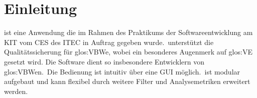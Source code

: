 \chapter{Einleitung}
\begin{normalsize}

\projektTitel ist eine Anwendung die im Rahmen des Praktikums der Softwareentwicklung am \gls{KIT} vom \gls{CES} des \gls{ITEC} in Auftrag gegeben wurde.\
\projektTitel unterstützt die Qualitätssicherung für \gls{glos:VBW}e, wobei ein besonderes Augenmerk auf \gls{glos:VE} gesetzt wird. Die Software dient so insbesondere Entwicklern von \gls{glos:VBW}en.\
Die Bedienung ist intuitiv über eine GUI möglich.\
\projektTitel ist modular aufgebaut und kann flexibel durch weitere Filter und Analysemetriken erweitert werden.

\end{normalsize}



